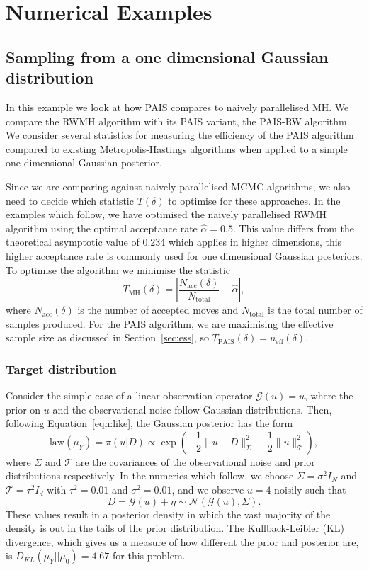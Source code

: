 \documentclass[final]{siamltex}
\newcommand{\G}{\mathcal{G}}
\newcommand{\neff}{n_{\text{eff}}}
\begin{document}
\section{Numerical Examples}\label{Sec:Num}

\subsection{Sampling from a one dimensional Gaussian distribution}\label{sec:problem 1}

In this example we look at how PAIS compares to naively parallelised
MH. We compare the RWMH algorithm with its
PAIS variant, the PAIS-RW algorithm. We consider several statistics
for measuring the efficiency of the PAIS algorithm compared to
existing Metropolis-Hastings algorithms when applied to a simple one
dimensional Gaussian posterior.


Since we are comparing against naively parallelised MCMC algorithms,
we also need to decide which statistic $T(\delta)$ to optimise for
these approaches. In the examples which follow, we have optimised the naively parallelised RWMH algorithm using the optimal acceptance rate $\hat{\alpha} = 0.5$. This value differs from the theoretical asymptotic value of 0.234 which applies in higher dimensions, this higher acceptance rate is commonly used for one dimensional Gaussian posteriors. To optimise the algorithm we minimise the statistic
\[
	T_{\text{MH}}(\delta) = \left| \frac{N_{\text{acc}}(\delta)}{N_{\text{total}}} - \hat{\alpha} \right|,
\]
where $N_{\text{acc}}(\delta)$ is the number of accepted moves and
$N_{\text{total}}$ is the total number of samples produced. For the
PAIS algorithm, we are maximising the effective sample size as
discussed in Section~\ref{sec:ess}, so $T_{\text{PAIS}}(\delta) =
\neff(\delta)$.

\subsubsection{Target distribution}

Consider the simple case of a linear observation operator $\G(u) = u$, where the prior on $u$ and the observational noise follow Gaussian distributions. Then, following Equation~\ref{eqn:like}, the Gaussian posterior has the form
\begin{equation}\label{eqn:Gaussian posterior}
	\text{law}(\mu_Y) = \pi(u|D) \propto \exp\left(-\frac{1}{2}\big\|u - D\big\|^2_\Sigma - \frac{1}{2}\big\|u\big\|^2_{\mathcal{T}}\right),
\end{equation}
where $\Sigma$ and $\mathcal{T}$ are the covariances of the
observational noise and prior distributions respectively. In the
numerics which follow, we choose $\Sigma = \sigma^2I_N$ and
$\mathcal{T} = \tau^2I_d$ with $\tau^2 =0.01$ and $\sigma^2 = 0.01$, and
we observe $u=4$ noisily such that
\[
D = \mathcal{G}(u) + \eta \sim \mathcal{N}(\mathcal{G}(u),\Sigma).
\]
These values result in a posterior density in which the vast majority
of the density is out in the tails of the
prior distribution. The Kullback-Leibler (KL)
divergence, which gives us a measure of how different the prior and
posterior are, is $D_{KL}(\mu_Y || \mu_0) = 4.67$ for this problem.
\end{document}
